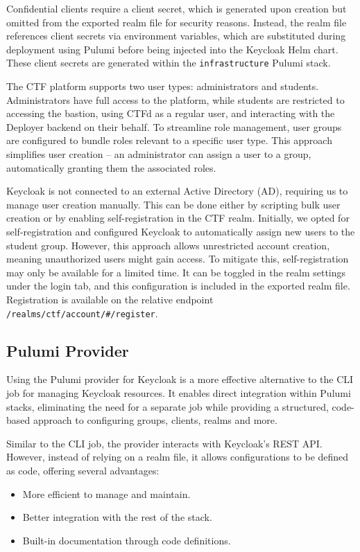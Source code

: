 Confidential clients require a client secret, which is generated upon creation but omitted from the exported realm file for security reasons. Instead, the realm file references client secrets via environment variables, which are substituted during deployment using Pulumi before being injected into the Keycloak Helm chart. These client secrets are generated within the \texttt{infrastructure} Pulumi stack.

The CTF platform supports two user types: administrators and students. Administrators have full access to the platform, while students are restricted to accessing the bastion, using CTFd as a regular user, and interacting with the Deployer backend on their behalf. To streamline role management, user groups are configured to bundle roles relevant to a specific user type. This approach simplifies user creation -- an administrator can assign a user to a group, automatically granting them the associated roles.

Keycloak is not connected to an external Active Directory (AD), requiring us to manage user creation manually. This can be done either by scripting bulk user creation or by enabling self-registration in the CTF realm. Initially, we opted for self-registration and configured Keycloak to automatically assign new users to the student group. However, this approach allows unrestricted account creation, meaning unauthorized users might gain access. To mitigate this, self-registration may only be available for a limited time. It can be toggled in the realm settings under the login tab, and this configuration is included in the exported realm file. Registration is available on the relative endpoint \texttt{/realms/ctf/account/\#/register}. 

\subsection{Pulumi Provider}
Using the Pulumi provider for Keycloak \parencite{pulumiKeycloak} is a more effective alternative to the CLI job for managing Keycloak resources. It enables direct integration within Pulumi stacks, eliminating the need for a separate job while providing a structured, code-based approach to configuring groups, clients, realms and more.

Similar to the CLI job, the provider interacts with Keycloak's REST API. However, instead of relying on a realm file, it allows configurations to be defined as code, offering several advantages:

\begin{itemize}
    \item More efficient to manage and maintain.
    \item Better integration with the rest of the stack.
    \item Built-in documentation through code definitions.
\end{itemize}

